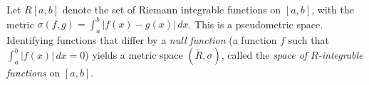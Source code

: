 Let $R[a, b]$ denote the set of Riemann integrable functions on $[a, b]$, with the metric $\sigma(f, g) = \int_a^b |f(x) - g(x)| \, dx$. This is a pseudometric space. Identifying functions that differ by a \emph{null function} (a function $f$ such that $\int_a^b |f(x)| \, dx = 0$) yields a metric space $(\tilde{R}, \sigma)$, called the \emph{space of $R$-integrable functions} on $[a, b]$.
